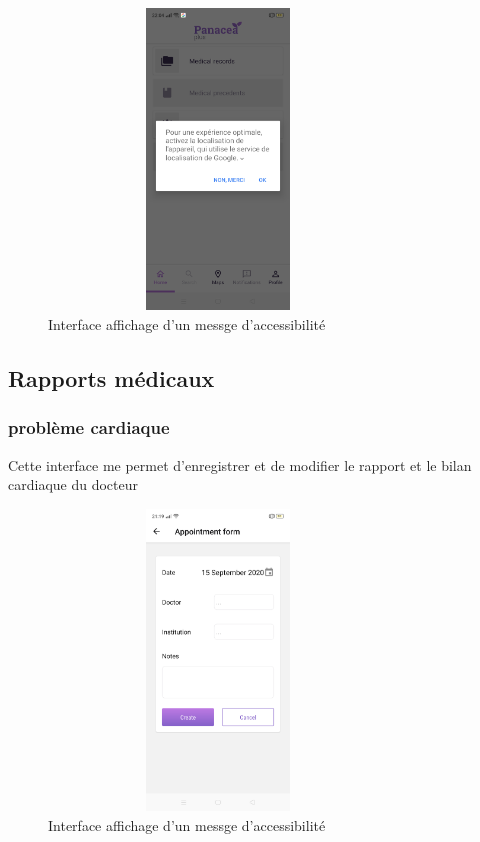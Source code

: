 \begin{figure}[H]
  \centering
\includegraphics[width=9cm,height=8cm,keepaspectratio]{Application/auto.png} 
\caption{Interface affichage d'un messge d'accessibilité}
\end{figure}
 \subsection{Rapports médicaux }

  \subsubsection{problème cardiaque}
  Cette interface me permet d'enregistrer et de modifier  le rapport et le bilan cardiaque du docteur
  \begin{figure}[H]
  \centering
\includegraphics[width=9cm,height=8cm,keepaspectratio]{Application/bil.png} 
\caption{Interface affichage d'un messge d'accessibilité }
\end{figure}

